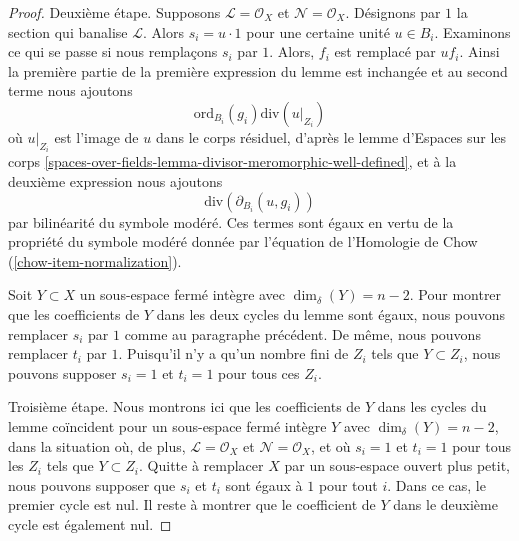 \begin{proof}
\medskip\noindent
Deuxième étape. Supposons $\mathcal{L} = \mathcal{O}_X$ et $\mathcal{N} =
\mathcal{O}_X$. Désignons par $1$ la section qui banalise $\mathcal{L}$. Alors
$s_i = u \cdot 1$ pour une certaine unité $u \in B_i$. Examinons ce qui se passe
si nous remplaçons $s_i$ par $1$. Alors, $f_i$ est remplacé par $u f_i$.
Ainsi la première partie de la première expression du lemme est inchangée et
au second terme nous ajoutons
$$
\text{ord}_{B_i}(g_i)\text{div}(u|_{Z_i})
$$
où $u|_{Z_i}$ est l'image de $u$ dans le corps résiduel, d'après le lemme d'Espaces sur les corps \ref{spaces-over-fields-lemma-divisor-meromorphic-well-defined},
et à la deuxième expression nous ajoutons
$$
\text{div}(\partial_{B_i}(u, g_i))
$$
par bilinéarité du symbole modéré. Ces termes sont égaux en vertu de la
propriété du symbole modéré donnée par l'équation de l'Homologie de Chow
(\ref{chow-item-normalization}).

\medskip\noindent
Soit $Y \subset X$ un sous-espace fermé intègre avec $\dim_\delta(Y) = n -
2$. Pour montrer que les coefficients de $Y$ dans les deux cycles du lemme sont
égaux, nous pouvons remplacer $s_i$ par $1$ comme au paragraphe
précédent. De même, nous pouvons remplacer $t_i$ par $1$. Puisqu'il n'y a qu'un nombre fini de $Z_i$ tels
que $Y \subset Z_i$, nous pouvons supposer $s_i = 1$ et $t_i = 1$ pour tous
ces $Z_i$.

\medskip\noindent
Troisième étape. Nous montrons ici que les coefficients de $Y$ dans les cycles
du lemme coïncident pour un sous-espace fermé intègre $Y$ avec
$\dim_\delta(Y) = n - 2$, dans la situation où, de plus, $\mathcal{L} = \mathcal{O}_X$ et
$\mathcal{N} = \mathcal{O}_X$, et où $s_i = 1$ et $t_i = 1$ pour tous les $Z_i$ tels
que $Y \subset Z_i$. Quitte à remplacer $X$ par un sous-espace ouvert plus
petit, nous pouvons supposer que $s_i$ et $t_i$ sont égaux à $1$ pour
tout $i$. Dans ce cas, le premier cycle est nul. Il reste à montrer
que le coefficient de $Y$ dans le deuxième cycle est également nul.


\end{proof}
